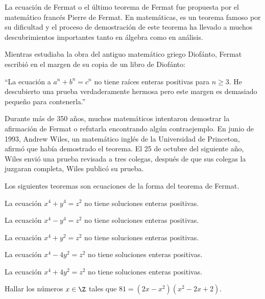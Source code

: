 La ecuación de Fermat o el último teorema de Fermat fue propuesta por el matemático francés Pierre de Fermat.
En matemáticas, es un teorema famoso por su dificultad y el proceso de demostración de este teorema ha llevado a muchos descubrimientos importantes tanto en álgebra como en análisis.

Mientras estudiaba la obra del antiguo matemático griego Diofánto,
Fermat escribió en el margen de su copia de un libro de Diofánto:
\begin{center}
    ``La ecuación a $a^n + b^n = c^n$ no tiene raíces enteras positivas para $n \geq 3$.
    He descubierto una prueba verdaderamente hermosa pero este margen es demasiado pequeño para contenerla.''
\end{center}
Durante más de 350 años, muchos matemáticos intentaron demostrar la afirmación de Fermat o refutarla encontrando algún contraejemplo.
En junio de 1993, Andrew Wiles, un matemático inglés de la Universidad de Princeton, afirmó que había demostrado el teorema.
El 25 de octubre del siguiente año, Wiles envió una prueba revisada a tres colegas, después de que sus colegas la juzgaran completa, Wiles publicó su prueba.

Los siguientes teoremas son ecuaciones de la forma del teorema de Fermat.

\begin{theorem.box}{}{}
    La ecuación $x^4 + y^4 = z^2$ no tiene soluciones enteras positivas.
\end{theorem.box}

\begin{theorem.box}{}{}
    La ecuación $x^4 - y^4 = z^2$ no tiene soluciones enteras positivas.
\end{theorem.box}

\begin{theorem.box}{}{}
    La ecuación $x^4 + y^2 = z^2$ no tiene soluciones enteras positivas.
\end{theorem.box}

\begin{theorem.box}{}{}
    La ecuación $x^4 - 4y^2 = z^2$ no tiene soluciones enteras positivas.
\end{theorem.box}

\begin{theorem.box}{}{}
    La ecuación $x^4 + 4y^2 = z^2$ no tiene soluciones enteras positivas.
\end{theorem.box}

\begin{example}
    Hallar los números $x \in \Z$ tales que $81 = (2x - x^2)(x^2 -2x + 2)$.
\end{example}

